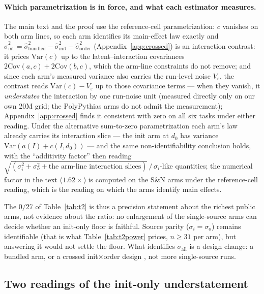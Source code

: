 \paragraph{Which parametrization is in force, and what each estimator measures.}
The main text and the proof use the reference-cell parametrization: $c$ vanishes on both arm
lines, so each arm identifies its main-effect law exactly and
$\hat\sigma^2_{\mathrm{int}} = \hat\sigma^2_{\mathrm{bundled}} - \hat\sigma^2_{\mathrm{init}} -
\hat\sigma^2_{\mathrm{order}}$ (Appendix~\ref{app:crossed}) is an interaction contrast: it prices
$\mathrm{Var}(c)$ up to the latent--interaction covariances
$2\mathrm{Cov}(a,c)+2\mathrm{Cov}(b,c)$, which the arm-line constraints do not remove;
and since each arm's measured variance also carries the run-level noise $V_\varepsilon$,
the contrast reads $\mathrm{Var}(c) - V_\varepsilon$ up to those covariance
terms --- when they vanish, it \emph{understates} the
interaction by one run-noise unit (measured directly only on our own 20M grid; the
PolyPythias arms do not admit the measurement);
Appendix~\ref{app:crossed} finds it consistent with zero on all six tasks under either
reading.
Under the alternative sum-to-zero parametrization each arm's law already carries its
interaction slice --- the init arm at $d_0$ has variance $\mathrm{Var}(a(I) + c(I, d_0))$ ---
and the same non-identifiability conclusion holds, with the ``additivity factor'' then reading
$\sqrt{(\sigma_i^2 + \sigma_o^2 + \text{the arm-line interaction slices})}\,/\,\sigma_i$-like
quantities; the numerical factor in the text ($1.62\times$) is computed on the S\&N arms under
the reference-cell reading, which is the reading on which the arms identify main effects.

The $0/27$ of Table~\ref{tab:t2} is thus a
precision statement about the richest public arms, not evidence about the ratio: no enlargement of the single-source arms can
decide whether an init-only floor is faithful. Source parity ($\sigma_i = \sigma_o$)
remains identifiable (that is what Table~\ref{tab:t2power} prices, $n \ge 31$ per arm), but
answering it would not settle the floor. What identifies $\sigma_{\mathrm{all}}$ is a design
change: a bundled arm, or a crossed init$\times$order design \citep{dodge2020finetuning}, not more
single-source runs.

\subsection{Two readings of the init-only understatement}
\label{app:t2-bundle}

